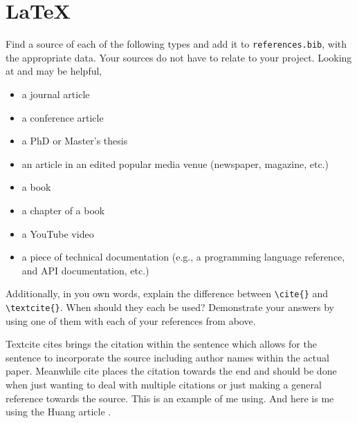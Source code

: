 \documentclass[10pt,twocolumn]{article}
\begin{document}
\section{\LaTeX}

Find a source of each of the following types and add it to \texttt{references.bib}, with the appropriate data. Your sources do not have to relate to your project. Looking at \textcite{OverleafBibliographyManagement} and \textcite{WikipediaBibtex} may be helpful,

\begin{itemize}
\item a journal article
\subitem \cite{hoadley_using_2005}

\item a conference article
\subitem \cite{huang_how_2023}

\item a PhD or Master's thesis
\subitem \cite{noauthor_phd_nodate}

\item an article in an edited popular media venue (newspaper, magazine, etc.)
\subitem \cite{noauthor_microsoft_nodate}

\item a book
\subitem \cite{shackelford_forks_2023}

\item a chapter of a book
\subitem \cite{sugiki_ocean_2022}

\item a YouTube video
\subitem \cite{noauthor_react_nodate}

\item a piece of technical documentation (e.g., a programming language reference, and API documentation, etc.)
\subitem \cite{noauthor_react_nodate-1}

\end{itemize}

Additionally, in you own words, explain the difference between \texttt{{\textbackslash}cite\{\}} and \texttt{{\textbackslash}textcite\{\}}. When should they each be used? Demonstrate your answers by using one of them with each of your references from above.

\subitem Textcite cites brings the citation within the sentence which allows for the sentence to incorporate the source including author names within the actual paper. Meanwhile cite places the citation towards the end and should be done when just wanting to deal with multiple citations or just making a general reference towards the source. This is an example of me using\textcite{hoadley_using_2005}. And here is me using the Huang article \cite{huang_how_2023}.



\printbibliography
\end{document}

